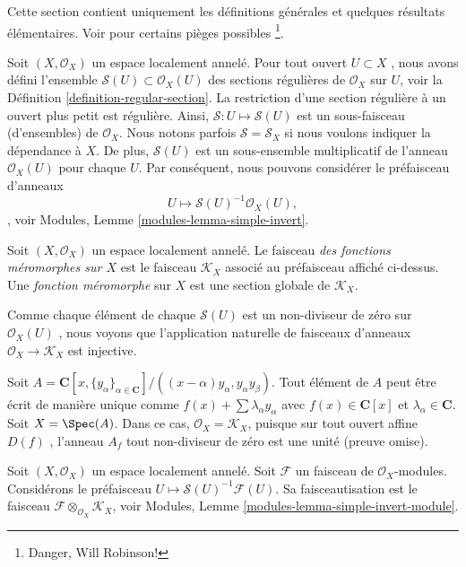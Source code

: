 \noindent
Cette section contient uniquement les définitions générales et quelques résultats
élémentaires. Voir  \cite{misconceptions}  pour certains pièges possibles \footnote
{Danger, Will Robinson! }.

\medskip\noindent
Soit  $(X, \mathcal{O}_X)$  un espace localement annelé. Pour tout ouvert  $U \subset X$ , nous
avons défini l'ensemble  $\mathcal{S}(U) \subset \mathcal{O}_X(U)$  des sections régulières de  $\mathcal{O}_X$  sur
 $U$, voir la Définition  \ref{definition-regular-section}. La restriction d'une section
régulière à un ouvert plus petit est régulière. Ainsi,  $\mathcal{S} : U \mapsto \mathcal{S}(U)$  est un
sous-faisceau (d'ensembles) de  $\mathcal{O}_X$. Nous notons parfois  $\mathcal{S} = \mathcal{S}_X$  si
nous voulons indiquer la dépendance à  $X$. De plus,  $\mathcal{S}(U)$  est un
sous-ensemble multiplicatif de l'anneau  $\mathcal{O}_X(U)$  pour chaque  $U$. Par
conséquent, nous pouvons considérer le préfaisceau d'anneaux
$$
U \longmapsto \mathcal{S}(U)^{-1} \mathcal{O}_X(U),
$$
, voir Modules, Lemme  \ref{modules-lemma-simple-invert}.

\begin{definition}
\label{definition-sheaf-meromorphic-functions}
Soit  $(X, \mathcal{O}_X)$  un espace localement annelé. Le faisceau
 {\it  des fonctions méromorphes sur  $X$} 
est le faisceau  {\it   $\mathcal{K}_X$}  associé au
préfaisceau affiché ci-dessus. Une  {\it  fonction méromorphe
}  sur  $X$  est une section globale de  $\mathcal{K}_X$.
\end{definition}

\noindent
Comme chaque élément de chaque  $\mathcal{S}(U)$  est un non-diviseur de zéro sur
 $\mathcal{O}_X(U)$ , nous voyons que l'application naturelle de faisceaux d'anneaux
 $\mathcal{O}_X \to \mathcal{K}_X$  est injective.

\begin{example}
\label{example-no-change}
Soit  $A = \mathbf{C}[x, \{y_\alpha\}_{\alpha \in \mathbf{C}}]/
((x - \alpha)y_\alpha, y_\alpha y_\beta)$. Tout élément de  $A$  peut être écrit de manière unique
comme  $f(x) + \sum \lambda_\alpha y_\alpha$  avec  $f(x) \in \mathbf{C}[x]$  et  $\lambda_\alpha \in \mathbf{C}$. Soit  $X = \Spec(A)$. Dans ce
cas,  $\mathcal{O}_X = \mathcal{K}_X$, puisque sur tout ouvert affine  $D(f)$ , l'anneau
 $A_f$  tout non-diviseur de zéro est une unité (preuve omise).
\end{example}

\noindent
Soit  $(X, \mathcal{O}_X)$  un espace localement annelé. Soit  $\mathcal{F}$  un faisceau de
 $\mathcal{O}_X$-modules. Considérons le préfaisceau  $U \mapsto \mathcal{S}(U)^{-1}\mathcal{F}(U)$. Sa faisceautisation
est le faisceau  $\mathcal{F} \otimes_{\mathcal{O}_X} \mathcal{K}_X$, voir Modules, Lemme  \ref{modules-lemma-simple-invert-module}.


